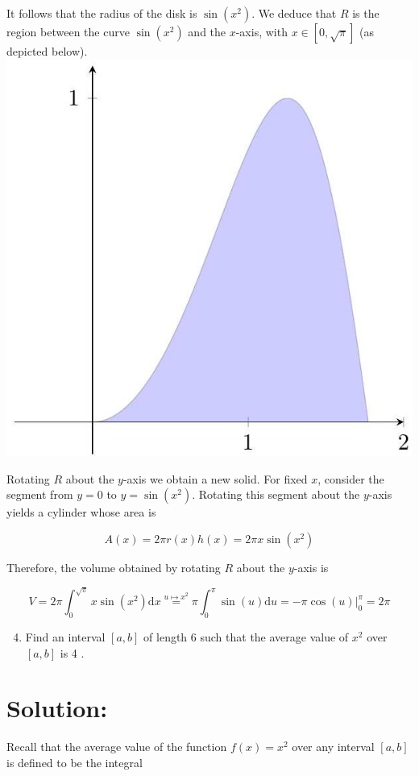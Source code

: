 \documentclass[10pt]{article}
\begin{document}
It follows that the radius of the disk is $\sin \left(x^{2}\right)$. We deduce that $R$ is the region between the curve $\sin \left(x^{2}\right)$ and the $x$-axis, with $x \in[0, \sqrt{\pi}]$ (as depicted below).\\
\includegraphics[max width=\textwidth, center]{2024_12_27_071a2f78100f58bfb468g-05}

Rotating $R$ about the $y$-axis we obtain a new solid. For fixed $x$, consider the segment from $y=0$ to $y=\sin \left(x^{2}\right)$. Rotating this segment about the $y$-axis yields a cylinder whose area is

$$
A(x)=2 \pi r(x) h(x)=2 \pi x \sin \left(x^{2}\right)
$$

Therefore, the volume obtained by rotating $R$ about the $y$-axis is

$$
V=2 \pi \int_{0}^{\sqrt{\pi}} x \sin \left(x^{2}\right) \mathrm{d} x \stackrel{u \mapsto x^{2}}{=} \pi \int_{0}^{\pi} \sin (u) \mathrm{d} u=-\left.\pi \cos (u)\right|_{0} ^{\pi}=2 \pi
$$

\begin{enumerate}
  \setcounter{enumi}{3}
  \item Find an interval $[a, b]$ of length 6 such that the average value of $x^{2}$ over $[a, b]$ is 4 .
\end{enumerate}

\section*{Solution:}
Recall that the average value of the function $f(x)=x^{2}$ over any interval $[a, b]$ is defined to be the integral
\end{document}
